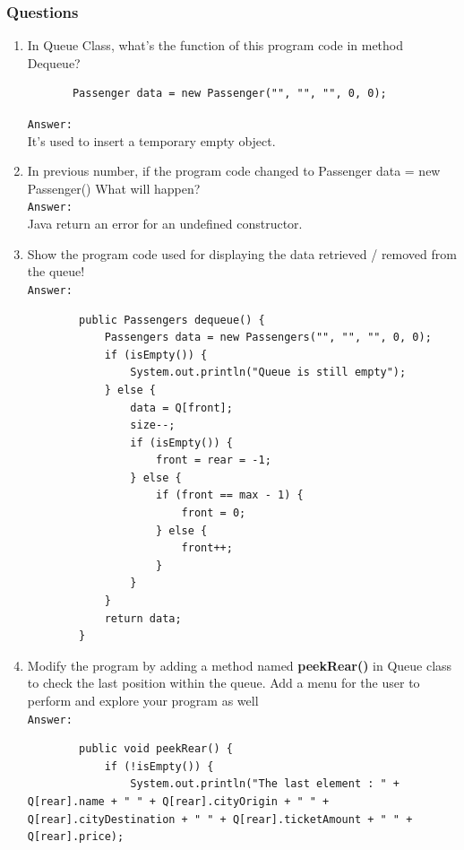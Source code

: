 \documentclass[12pt,titlepage]{article}
\begin{document}
\subsubsection{Questions}
\begin{enumerate}
    \item In Queue Class, what’s the function of this program code in method Dequeue?
    \begin{verbatim}
       Passenger data = new Passenger("", "", "", 0, 0);
    \end{verbatim}
    \texttt{Answer: }
    \mbox{}\\
    It's used to insert a temporary empty object.
    \item In previous number, if the program code changed to Passenger data = new Passenger() What will happen?
    \mbox{}\\
    \texttt{Answer: }
    \mbox{}\\
    Java return an error for an undefined constructor.
    \item Show the program code used for displaying the data retrieved / removed from the queue!
    \mbox{}\\
    \texttt{Answer: }
    \begin{verbatim}
        public Passengers dequeue() {
            Passengers data = new Passengers("", "", "", 0, 0);
            if (isEmpty()) {
                System.out.println("Queue is still empty");
            } else {
                data = Q[front];
                size--;
                if (isEmpty()) {
                    front = rear = -1;
                } else {
                    if (front == max - 1) {
                        front = 0;
                    } else {
                        front++;
                    }
                }
            }
            return data;
        }
    \end{verbatim}
    \item Modify the program by adding a method named \textbf{peekRear()} in Queue class to check the last position within the queue. Add a menu for the user to perform and explore your program as well
    \mbox{}\\
    \texttt{Answer: }
    \begin{verbatim}
        public void peekRear() {
            if (!isEmpty()) {
                System.out.println("The last element : " + Q[rear].name + " " + Q[rear].cityOrigin + " " + Q[rear].cityDestination + " " + Q[rear].ticketAmount + " " + Q[rear].price);

\end{verbatim}
\end{enumerate}
\end{document}
